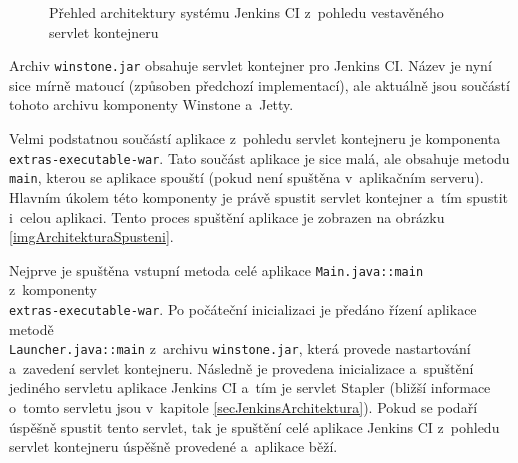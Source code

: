             \begin{figure}[h!t]
                \begin{center}
                    \caption{Přehled architektury systému Jenkins CI z~pohledu vestavěného servlet kontejneru}
                    \label{imgArchitekturaServlet}
                \end{center}
            \end{figure}

            
            Archiv \texttt{winstone.jar} obsahuje servlet kontejner pro Jenkins CI. Název je nyní sice mírně matoucí
            (způsoben předchozí implementací), ale aktuálně jsou součástí tohoto archivu komponenty Winstone a~Jetty.

            Velmi podstatnou součástí aplikace z~pohledu servlet kontejneru je komponenta\\\texttt{extras-executable-war}. 
            Tato součást aplikace je sice malá, ale obsahuje metodu \texttt{main}, kterou se aplikace spouští 
            (pokud není spuštěna v~aplikačním serveru). Hlavním úkolem této komponenty je právě spustit 
            servlet kontejner a~tím spustit i~celou aplikaci. Tento proces spuštění aplikace je zobrazen
            na obrázku \ref{imgArchitekturaSpusteni}.

            Nejprve je spuštěna vstupní metoda celé aplikace \texttt{Main.java::main} z~komponenty\\\texttt{extras-executable-war}.
            Po počáteční inicializaci je předáno řízení aplikace metodě \\\texttt{Launcher.java::main}
            z~archivu \texttt{winstone.jar}, která provede nastartování
            a~zavedení servlet kontejneru. Následně je provedena inicializace a~spuštění
            jediného servletu aplikace Jenkins CI a~tím je servlet Stapler (bližší informace o~tomto
            servletu jsou v~kapitole \ref{secJenkinsArchitektura}). 
            Pokud se podaří úspěšně spustit tento servlet, tak je spuštění celé aplikace Jenkins CI z~pohledu
            servlet kontejneru úspěšně provedené a~aplikace běží.

